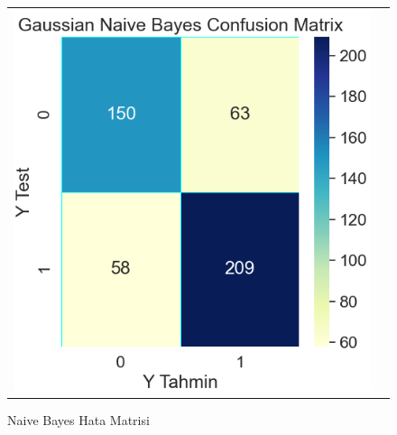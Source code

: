 \documentclass[conference]{IEEEtran}
\begin{document}
\begin{figure}[!h]
	\centering
	\begin{center}
		\begin{tabular}{cc}
			\includegraphics[scale=0.4]{pictures/pic_13.png}&
		\end{tabular}
	\end{center}
	\caption{Naive Bayes Hata Matrisi}
	\label{fig:13}
\end{figure}
\end{document}
